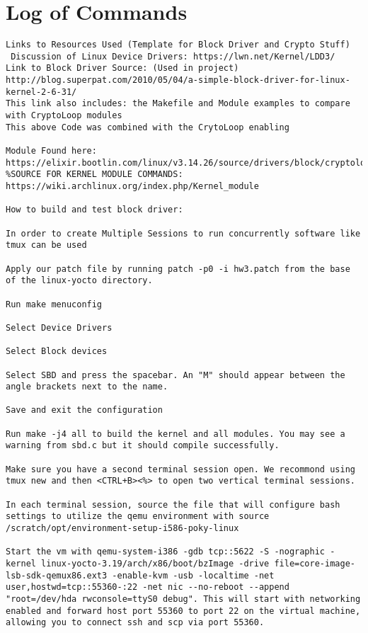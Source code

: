 \documentclass[onecolumn, draftclsnofoot,10pt, compsoc]{IEEEtran}
\begin{document}
\section{Log of Commands}
\begin{verbatim}
Links to Resources Used (Template for Block Driver and Crypto Stuff)
 Discussion of Linux Device Drivers: https://lwn.net/Kernel/LDD3/
Link to Block Driver Source: (Used in project) http://blog.superpat.com/2010/05/04/a-simple-block-driver-for-linux-kernel-2-6-31/
This link also includes: the Makefile and Module examples to compare with CryptoLoop modules
This above Code was combined with the CrytoLoop enabling 

Module Found here: https://elixir.bootlin.com/linux/v3.14.26/source/drivers/block/cryptoloop.c
%SOURCE FOR KERNEL MODULE COMMANDS: https://wiki.archlinux.org/index.php/Kernel_module

How to build and test block driver:

In order to create Multiple Sessions to run concurrently software like tmux can be used

Apply our patch file by running patch -p0 -i hw3.patch from the base of the linux-yocto directory.

Run make menuconfig

Select Device Drivers

Select Block devices

Select SBD and press the spacebar. An "M" should appear between the angle brackets next to the name.

Save and exit the configuration

Run make -j4 all to build the kernel and all modules. You may see a warning from sbd.c but it should compile successfully.

Make sure you have a second terminal session open. We recommond using tmux new and then <CTRL+B><%> to open two vertical terminal sessions.

In each terminal session, source the file that will configure bash settings to utilize the qemu environment with source /scratch/opt/environment-setup-i586-poky-linux

Start the vm with qemu-system-i386 -gdb tcp::5622 -S -nographic -kernel linux-yocto-3.19/arch/x86/boot/bzImage -drive file=core-image-lsb-sdk-qemux86.ext3 -enable-kvm -usb -localtime -net user,hostwd=tcp::55360-:22 -net nic --no-reboot --append "root=/dev/hda rwconsole=ttyS0 debug". This will start with networking enabled and forward host port 55360 to port 22 on the virtual machine, allowing you to connect ssh and scp via port 55360.


\end{verbatim}
\end{document}
